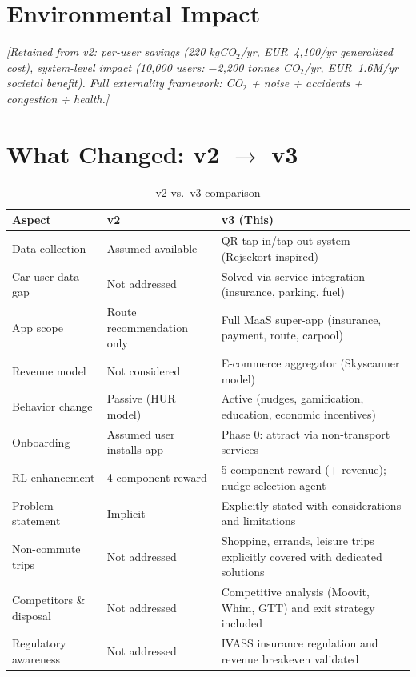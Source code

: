 \documentclass[11pt,a4paper]{article}
\begin{document}
\section{Environmental Impact}
\label{sec:impact}

\textit{[Retained from v2: per-user savings (220 kgCO$_2$/yr, EUR~4,100/yr generalized cost), system-level impact (10,000 users: $-$2,200 tonnes CO$_2$/yr, EUR~1.6M/yr societal benefit). Full externality framework: CO$_2$ + noise + accidents + congestion + health.]}

\section{What Changed: v2 $\rightarrow$ v3}
\label{sec:differences}

\begin{table}[H]
\centering
\caption{v2 vs.\ v3 comparison}
\begin{tabular}{@{}p{3cm}p{5cm}p{5cm}@{}}
\toprule
\textbf{Aspect} & \textbf{v2} & \textbf{v3 (This)} \\
\midrule
Data collection & Assumed available & QR tap-in/tap-out system (Rejsekort-inspired) \\
\addlinespace
Car-user data gap & Not addressed & Solved via service integration (insurance, parking, fuel) \\
\addlinespace
App scope & Route recommendation only & Full MaaS super-app (insurance, payment, route, carpool) \\
\addlinespace
Revenue model & Not considered & E-commerce aggregator (Skyscanner model) \\
\addlinespace
Behavior change & Passive (HUR model) & Active (nudges, gamification, education, economic incentives) \\
\addlinespace
Onboarding & Assumed user installs app & Phase 0: attract via non-transport services \\
\addlinespace
RL enhancement & 4-component reward & 5-component reward (+ revenue); nudge selection agent \\
\addlinespace
Problem statement & Implicit & Explicitly stated with considerations and limitations \\
\addlinespace
Non-commute trips & Not addressed & Shopping, errands, leisure trips explicitly covered with dedicated solutions \\
\addlinespace
Competitors \& disposal & Not addressed & Competitive analysis (Moovit, Whim, GTT) and exit strategy included \\
\addlinespace
Regulatory awareness & Not addressed & IVASS insurance regulation and revenue breakeven validated \\
\bottomrule
\end{tabular}
\end{table}
\end{document}
